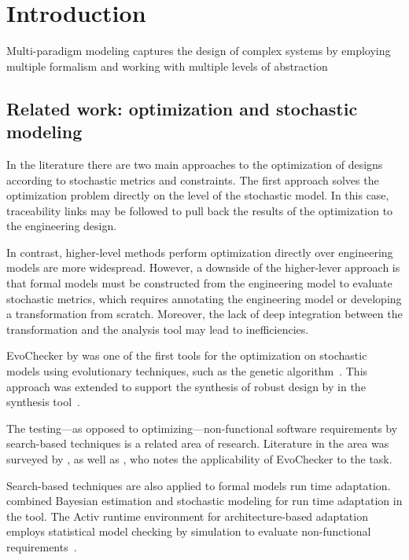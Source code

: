 \chapter{Introduction}
\label{chap:intro}

Multi-paradigm modeling captures the design of complex systems by employing multiple formalism and working with multiple levels of abstraction


\section{Related work: optimization and stochastic modeling}
\label{sec:intro:relwork}

In the literature there are two main approaches to the optimization of designs according to stochastic metrics and constraints. The first approach solves the optimization problem directly on the level of the stochastic model. In this case, traceability links may be followed to pull back the results of the optimization to the engineering design.

In contrast, higher-level methods perform optimization directly over engineering models are more widespread. However, a downside of the higher-lever approach is that formal models must be constructed from the engineering model to evaluate stochastic metrics, which requires annotating the engineering model or developing a transformation from scratch. Moreover, the lack of deep integration between the transformation and the analysis tool may lead to inefficiencies.

EvoChecker by \citet{Gerasimou15evochecker} was one of the first tools for the optimization on stochastic models using evolutionary techniques, such as the  genetic algorithm~\citep{Deb02nsga}. This approach was extended to support the synthesis of robust design by \citet{Calinescu17robust} in the  synthesis tool~\citep{Calinescu17rodes}.

The testing---as opposed to optimizing---non-functional software requirements by search-based techniques is a related area of research. Literature in the area was surveyed by \citet{Afzal09testing}, as well as \citet{Parasa16testing}, who notes the applicability of EvoChecker to the task.

Search-based techniques are also applied to formal models run time adaptation. \citet{Epifani09adaptation} combined Bayesian estimation and stochastic modeling for run time adaptation in the  tool. The Activ runtime environment for architecture-based adaptation employs statistical model checking by simulation to evaluate non-functional requirements~\citep{Iftikhar17activforms}.

